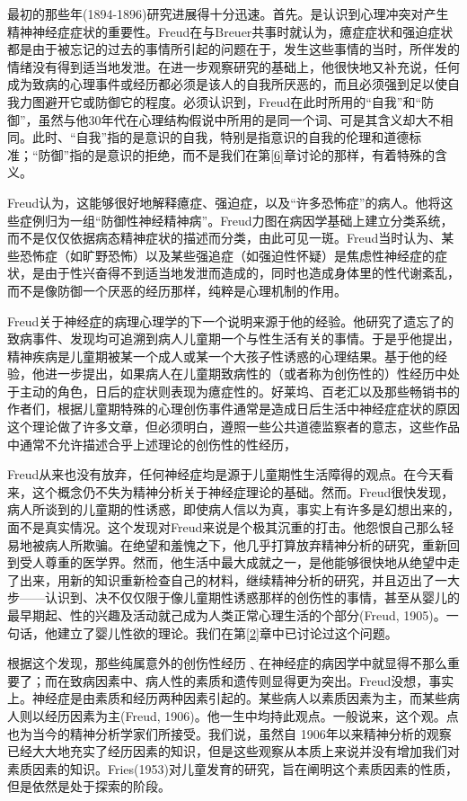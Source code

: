 \documentclass[UTF8,10pt,a4paper,openany]{book}
\begin{document}
最初的那些年(1894-1896)研究进展得十分迅速。首先。是认识到心理冲突对产生精神神经症症状的重要性。Freud在与Breuer共事时就认为，癔症症状和强迫症状都是由于被忘记的过去的事情所引起的问题在于，发生这些事情的当时，所伴发的情绪没有得到适当地发泄。在进一步观察研究的基础上，他很快地又补充说，任何成为致病的心理事件或经历都必须是该人的自我所厌恶的，而且必须强到足以使自我力图避开它或防御它的程度。必须认识到，Freud在此时所用的“自我”和“防御”，虽然与他30年代在心理结构假说中所用的是同一个词、可是其含义却大不相同。此时、“自我”指的是意识的自我，特别是指意识的自我的伦理和道德标准；“防御”指的是意识的拒绝，而不是我们在第\ref{6}章讨论的那样，有着特殊的含义。

Freud认为，这能够很好地解释癔症、强迫症，以及“许多恐怖症”的病人。他将这些症例归为一组“防御性神经精神病”。Freud力图在病因学基础上建立分类系统，而不是仅仅依据病态精神症状的描述而分类，由此可见一斑。Freud当时认为、某些恐怖症（如旷野恐怖）以及某些强追症（如强迫性怀疑）是焦虑性神经症的症状，是由于性兴奋得不到适当地发泄而造成的，同时也造成身体里的性代谢紊乱，而不是像防御一个厌恶的经历那样，纯粹是心理机制的作用。

Freud关于神经症的病理心理学的下一个说明来源于他的经验。他研究了遗忘了的致病事件、发现均可追溯到病人儿童期一个与性生活有关的事情。于是乎他提出，精神疾病是儿童期被某一个成人或某一个大孩子性诱惑的心理结果。基于他的经验，他进一步提出，如果病人在儿童期致病性的（或者称为创伤性的）性经历中处于主动的角色，日后的症状则表现为癔症性的。好莱坞、百老汇以及那些畅销书的作者们，根据儿童期特殊的心理创伤事件通常是造成日后生活中神经症症状的原因这个理论做了许多文章，但必须明白，遵照一些公共道德监察者的意志，这些作品中通常不允许描述合乎上述理论的创伤性的性经历，

Freud从来也没有放弃，任何神经症均是源于儿童期性生活障得的观点。在今天看来，这个概念仍不失为精神分析关于神经症理论的基础。然而。Freud很快发现，病人所谈到的儿童期的性诱惑，即使病人信以为真，事实上有许多是幻想出来的，面不是真实情况。这个发现对Freud来说是个极其沉重的打击。他怨恨自己那么轻易地被病人所欺骗。在绝望和羞愧之下，他几乎打算放弃精神分析的研究，重新回到受人尊重的医学界。然而，他生活中最大成就之一，是他能够很快地从绝望中走了出来，用新的知识重新检查自己的材料，继续精神分析的研究，并且迈出了一大步——认识到、决不仅仅限于像儿童期性诱惑那样的创伤性的事情，甚至从婴儿的最早期起、性的兴趣及活动就己成为人类正常心理生活的个部分(Freud, 1905)。一句话，他建立了婴儿性欲的理论。我们在第\ref{2}章中已讨论过这个问题。

根据这个发现，那些纯属意外的创伤性经历﹑在神经症的病因学中就显得不那么重要了；而在致病因素中、病人性的素质和遗传则显得更为突出。Freud没想，事实上。神经症是由素质和经历两种因素引起的。某些病人以素质因素为主，而某些病人则以经历因素为主(Freud, 1906)。他一生中均持此观点。一般说来，这个观。点也为当今的精神分析学家们所接受。我们说，虽然自 1906年以来精神分析的观察已经大大地充实了经历因素的知识，但是这些观察从本质上来说并没有增加我们对素质因素的知识。Fries(1953)对儿童发育的研究，旨在阐明这个素质因素的性质，但是依然是处于探索的阶段。
\end{document}
